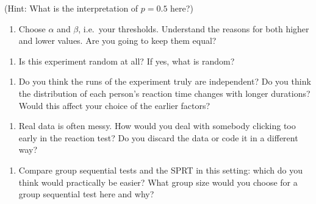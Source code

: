 \documentclass[
  letterpaper,
  DIV=11,
  numbers=noendperiod]{scrartcl}
\providecommand{\tightlist}{%
  \setlength{\itemsep}{0pt}\setlength{\parskip}{0pt}}
\begin{document}
(Hint: What is the interpretation of \(p = 0.5\) here?)

\hfill\break
\hfill\break
\hfill\break
\hfill\break
\hfill\break
\hfill\break

\begin{enumerate}
\def\labelenumi{\arabic{enumi}.}
\setcounter{enumi}{6}
\tightlist
\item
  Choose \(\alpha\) and \(\beta\), i.e.~your thresholds. Understand the
  reasons for both higher and lower values. Are you going to keep them
  equal?
\end{enumerate}

\hfill\break
\hfill\break
\hfill\break
\hfill\break
\hfill\break
\hfill\break

\begin{enumerate}
\def\labelenumi{\arabic{enumi}.}
\setcounter{enumi}{7}
\tightlist
\item
  Is this experiment random at all? If yes, what is random?
\end{enumerate}

\hfill\break
\hfill\break
\hfill\break
\hfill\break
\hfill\break
\hfill\break

\begin{enumerate}
\def\labelenumi{\arabic{enumi}.}
\setcounter{enumi}{8}
\tightlist
\item
  Do you think the runs of the experiment truly are independent? Do you
  think the distribution of each person's reaction time changes with
  longer durations? Would this affect your choice of the earlier
  factors?
\end{enumerate}

\hfill\break
\hfill\break
\hfill\break
\hfill\break
\hfill\break
\hfill\break

\begin{enumerate}
\def\labelenumi{\arabic{enumi}.}
\setcounter{enumi}{9}
\tightlist
\item
  Real data is often messy. How would you deal with somebody clicking
  too early in the reaction test? Do you discard the data or code it in
  a different way?
\end{enumerate}

\hfill\break
\hfill\break
\hfill\break
\hfill\break
\hfill\break
\hfill\break

\begin{enumerate}
\def\labelenumi{\arabic{enumi}.}
\setcounter{enumi}{10}
\tightlist
\item
  Compare group sequential tests and the SPRT in this setting: which do
  you think would practically be easier? What group size would you
  choose for a group sequential test here and why?
\end{enumerate}
\end{document}
